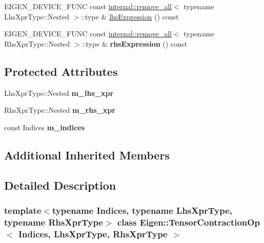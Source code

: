 \begin{DoxyCompactItemize}
\item 
E\+I\+G\+E\+N\+\_\+\+D\+E\+V\+I\+C\+E\+\_\+\+F\+U\+NC const \hyperlink{struct_eigen_1_1internal_1_1remove__all}{internal\+::remove\+\_\+all}$<$ typename Lhs\+Xpr\+Type\+::\+Nested $>$\+::type \& \hyperlink{class_eigen_1_1_tensor_contraction_op_a1e3bb92babac5554f7164b12e9654daa}{lhs\+Expression} () const
\item 
\mbox{\label{class_eigen_1_1_tensor_contraction_op_a93b684d992dd1936b99b9b9ec360251f}} 
E\+I\+G\+E\+N\+\_\+\+D\+E\+V\+I\+C\+E\+\_\+\+F\+U\+NC const \hyperlink{struct_eigen_1_1internal_1_1remove__all}{internal\+::remove\+\_\+all}$<$ typename Rhs\+Xpr\+Type\+::\+Nested $>$\+::type \& {\bfseries rhs\+Expression} () const
\end{DoxyCompactItemize}
\subsection*{Protected Attributes}
\begin{DoxyCompactItemize}
\item 
\mbox{\label{class_eigen_1_1_tensor_contraction_op_a8aae66aafa4e39bb351eb53550a9471f}} 
Lhs\+Xpr\+Type\+::\+Nested {\bfseries m\+\_\+lhs\+\_\+xpr}
\item 
\mbox{\label{class_eigen_1_1_tensor_contraction_op_aa4f138424d2c44d237be1c589716bb7c}} 
Rhs\+Xpr\+Type\+::\+Nested {\bfseries m\+\_\+rhs\+\_\+xpr}
\item 
\mbox{\label{class_eigen_1_1_tensor_contraction_op_ac85f1c9887937f1a3d242b021a570f06}} 
const Indices {\bfseries m\+\_\+indices}
\end{DoxyCompactItemize}
\subsection*{Additional Inherited Members}


\subsection{Detailed Description}
\subsubsection*{template$<$typename Indices, typename Lhs\+Xpr\+Type, typename Rhs\+Xpr\+Type$>$\newline
class Eigen\+::\+Tensor\+Contraction\+Op$<$ Indices, Lhs\+Xpr\+Type, Rhs\+Xpr\+Type $>$}



